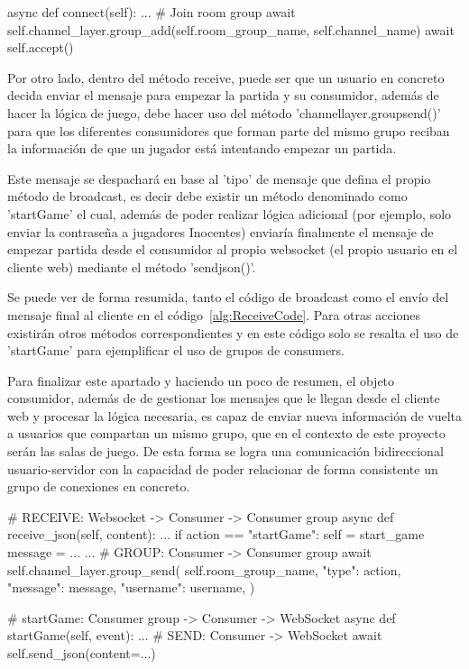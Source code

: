 \begin{mypython}[float={h},caption={Añadir consumer a un grupo},label={alg:JoinGroup}]
						
	async def connect(self):
		...
		# Join room group
		await self.channel_layer.group_add(self.room_group_name, self.channel_name)
		await self.accept()
									
\end{mypython}

Por otro lado, dentro del método receive, puede ser que un usuario en concreto decida enviar el mensaje para empezar la partida y su consumidor, además de hacer la lógica de juego, 
debe hacer uso del método 'channel\textunderscore layer.group\textunderscore send()' para que los diferentes consumidores que forman parte del mismo grupo reciban la 
información de que un jugador está intentando empezar un partida. 

Este mensaje se despachará en base al 'tipo' de mensaje que defina el propio método de broadcast, es decir debe
existir un método denominado como 'startGame' el cual, además de poder realizar lógica adicional (por ejemplo, solo enviar la contraseña a jugadores Inocentes) 
enviaría finalmente el mensaje de empezar partida desde el consumidor al propio websocket (el propio usuario en el cliente web) mediante el método 'send\textunderscore json()'. 

Se puede ver de forma resumida, tanto el código de broadcast como el envío del mensaje final al cliente en el código~\ref{alg:ReceiveCode}. Para otras acciones existirán
otros métodos correspondientes y en este código solo se resalta el uso de 'startGame' para ejemplificar el uso de grupos de consumers.

Para finalizar este apartado y haciendo un poco de resumen, el objeto consumidor, además de de gestionar los mensajes que le llegan desde el cliente web y procesar la lógica necesaria, 
es capaz de enviar nueva información de vuelta a usuarios que compartan un mismo grupo, que en el contexto de este proyecto serán las salas de juego. De esta forma se logra
una comunicación bidireccional usuario-servidor con la capacidad de poder relacionar de forma consistente un grupo de conexiones en concreto.

\begin{mypython}[float={h},caption={Broadcast a todos los consumidores y envío final al cliente},label={alg:ReceiveCode}]
						
	# RECEIVE: Websocket -> Consumer -> Consumer group
	async def receive_json(self, content):
		...	
		if action == "startGame":
		self = start_game
		message = {...}
		...	
		# GROUP: Consumer -> Consumer group
		await self.channel_layer.group_send(
		self.room_group_name,
		{"type": action, "message": message, "username": username},
		)
					
	# startGame: Consumer group -> Consumer -> WebSocket
	async def startGame(self, event):
		...
		# SEND: Consumer -> WebSocket
		await self.send_json(content={...})
									
\end{mypython}

